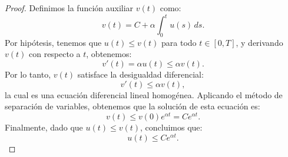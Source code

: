     \begin{proof}
      Definimos la función auxiliar $v(t)$ como:
      $$v(t) = C + \alpha \int_0^t u(s) \, ds.$$
      Por hipótesis, tenemos que $u(t) \leq v(t)$ para todo $t \in [0, T]$, y derivando $v(t)$ con respecto a $t$, obtenemos:
      $$v'(t) = \alpha u(t) \leq \alpha v(t).$$
      Por lo tanto, $v(t)$ satisface la desigualdad diferencial:
      $$v'(t) \leq \alpha v(t),$$
      la cual es una ecuación diferencial lineal homogénea. Aplicando el método de separación de variables, obtenemos que la solución de esta ecuación es:
      $$v(t) \leq v(0) e^{\alpha t} = C e^{\alpha t}.$$
      Finalmente, dado que $u(t) \leq v(t)$, concluimos que:
      $$u(t) \leq C e^{\alpha t}.$$
    \end{proof}
